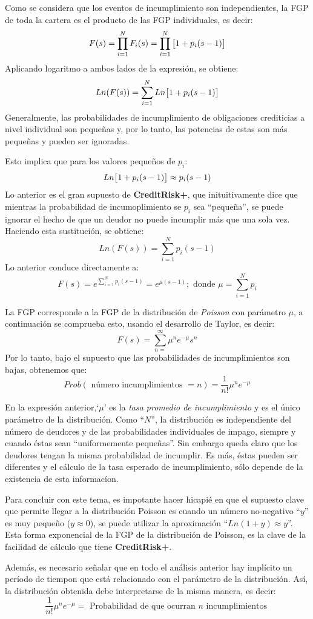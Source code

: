 \documentclass[
  12pt,
]{krantz}
\theoremstyle{definition}
\theoremstyle{definition}
\theoremstyle{definition}
\theoremstyle{remark}
\begin{document}
Como se considera que los eventos de incumplimiento son independientes, la FGP de toda la cartera es el producto de las FGP individuales, es decir:\[F(s)=\prod_{i=1}^NF_i(s)=\prod_{i=1}^N\big{[}1+p_i(s-1)\big{]}\]
Aplicando logaritmo a ambos lados de la expresión, se obtiene:\[Ln(F(s))=\sum_{i=1}^NLn\big{[}1+p_i(s-1)\big{]}\]
Generalmente, las probabilidades de incumplimiento de obligaciones crediticias a nivel individual son pequeñas y, por lo tanto, las potencias de estas son más pequeñas y pueden ser ignoradas.

Esto implica que para los valores pequeños de \(p_i\):\[Ln\big{[}1+p_i(s-1)\big{]}\approx p_i(s-1)\]
Lo anterior es el gran supuesto de \textbf{CreditRisk+}, que inituitivamente dice que mientras la probabilidad de incumoplimiento se \(p_i\) sea ``pequeña'', se puede ignorar el hecho de que un deudor no puede incumplir más que una sola vez. Haciendo esta sustitución, se obtiene:\[Ln(F(s))=\sum_{i=1}^Np_i(s-1)\]
Lo anterior conduce directamente a: \[F(s)=e^{\sum_{i=1}^Np_i(s-1)}=e^{\mu(s-1)};\textrm{ donde } \mu=\sum_{i=1}^Np_i\]

La FGP corresponde a la FGP de la distribución de \emph{Poisson} con parámetro \(\mu\), a continuación se comprueba esto, usando el desarrollo de Taylor, es decir:\[F(s)=\sum_{n=}^\infty\mu^ne^{-\mu}s^n\]
Por lo tanto, bajo el supuesto que las probabilidades de incumplimientos son bajas, obtenemos que:\[Prob(\textrm{ número incumplimientos }=n)=\frac{1}{n!}\mu^ne^{-\mu}\]

En la expresión anterior,`\(\mu\)' es la \emph{tasa promedio de incumplimiento} y es el único parámetro de la distribución. Como ``\(N\)'', la distribución es independiente del número de deudores y de las probabilidades individuales de impago, siempre y cuando éstas sean ``uniformemente pequeñas''. Sin embargo queda claro que los deudores tengan la misma probabilidad de incumplir. Es más, éstas pueden ser diferentes y el cálculo de la tasa esperado de incumplimiento, sólo depende de la existencia de esta informacíon.

Para concluir con este tema, es impotante hacer hicapié en que el supuesto clave que permite llegar a la distribución Poisson es cuando un número no-negativo ``\(y\)'' es muy pequeño (\(y\approx 0\)), se puede utilizar la aproximación ``\(Ln(1+y)\approx y\)''. Esta forma exponencial de la FGP de la distribución de Poisson, es la clave de la facilidad de cálculo que tiene \textbf{CreditRisk+}.

Además, es necesario señalar que en todo el análisis anterior hay implícito un período de tiempon que está relacionado con el parámetro de la distribución. Así, la distribución obtenida debe interpretarse de la misma manera, es decir:\[\frac{1}{n!}\mu^ne^{-\mu}=\textrm{ Probabilidad de que ocurran } n \textrm{ incumplimientos }\]
\end{document}
